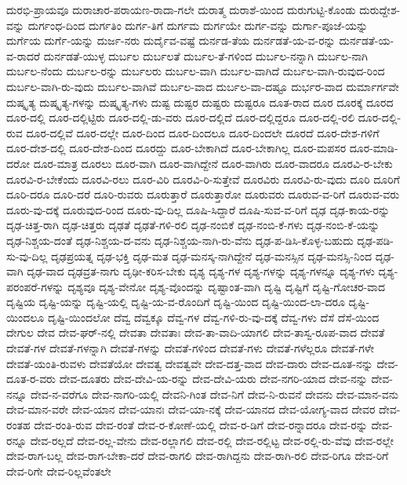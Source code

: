 {ದುರಭಿ-ಪ್ರಾಯವೂ
ದುರಾಚಾರ-ಪರಾಯಣ-ರಾದಾ-ಗಲೇ
ದುರಾತ್ಮ
ದುರಾಶೆ-ಯಿಂದ
ದುರುಗುಟ್ಟಿ-ಕೊಂಡು
ದುರುದ್ದೇಶ-ವನ್ನು
ದುರ್ಗಂಧ-ದಿಂದ
ದುರ್ಗತಿಂ
ದುರ್ಗ-ತಿಗೆ
ದುರ್ಗಮ
ದುರ್ಗಯೇ
ದುರ್ಗ-ವನ್ನು
ದುರ್ಗಾ-ಪೂಜೆ-ಯನ್ನು
ದುರ್ಗೆಯ
ದುರ್ಗೆ-ಯನ್ನು
ದುರ್ಜ-ನರು
ದುರ್ದೈವ-ವಷ್ಟೆ
ದುರ್ನಡ-ತೆಯ
ದುರ್ನಡತೆ-ಯ-ವ-ರನ್ನು
ದುರ್ನಡತೆ-ಯ-ವ-ರಾದರೆ
ದುರ್ನಡತೆ-ಯುಳ್ಳ
ದುರ್ಬಲ
ದುರ್ಬಲತೆ
ದುರ್ಬಲ-ತೆ-ಗಳಿಂದ
ದುರ್ಬಲ-ನನ್ನಾಗಿ
ದುರ್ಬಲ-ನಾಗಿ
ದುರ್ಬಲ-ನೆಂದು
ದುರ್ಬಲ-ರನ್ನು
ದುರ್ಬಲರು
ದುರ್ಬಲ-ವಾಗಿ
ದುರ್ಬಲ-ವಾಗಿದೆ
ದುರ್ಬಲ-ವಾಗಿ-ರುವುದ-ರಿಂದ
ದುರ್ಬಲ-ವಾಗಿ-ರು-ವುದು
ದುರ್ಬಲ-ವಾಗಿವೆ
ದುರ್ಬಲ-ವಾದ
ದುರ್ಬಲ-ವಾ-ದಷ್ಟೂ
ದುರ್ಭರ-ವಾದ
ದುರ್ಮಾರ್ಗವೇ
ದುಷ್ಕೃತ್ಯ
ದುಷ್ಕೃತ್ಯ-ಗಳನ್ನು
ದುಷ್ಕೃತ್ಯ-ಗಳು
ದುಷ್ಟ
ದುಷ್ಟರ
ದುಷ್ಟರು
ದುಷ್ಟರೂ
ದೂತ-ರಾದ
ದೂರ
ದೂರಕ್ಕೆ
ದೂರದ
ದೂರ-ದಲ್ಲಿ
ದೂರ-ದಲ್ಲಿಟ್ಟಿರು
ದೂರ-ದಲ್ಲಿ-ಡು-ವರು
ದೂರ-ದಲ್ಲಿದೆ
ದೂರ-ದಲ್ಲಿದ್ದರೂ
ದೂರ-ದಲ್ಲಿ-ರಲಿ
ದೂರ-ದಲ್ಲಿ-ರುವ
ದೂರ-ದಲ್ಲಿವೆ
ದೂರ-ದಲ್ಲೇ
ದೂರ-ದಿಂದ
ದೂರ-ದಿಂದಲೂ
ದೂರ-ದಿಂದಲೇ
ದೂರದೆ
ದೂರ-ದೇಶ-ಗಳಿಗೆ
ದೂರ-ದೇಶ-ದಲ್ಲಿ
ದೂರ-ದೇಶ-ದಿಂದ
ದೂರದ್ದು
ದೂರ-ಬೇಕಾಗಿದೆ
ದೂರ-ಬೇಕಾಗಿಲ್ಲ
ದೂರ-ಮಪಸರ
ದೂರ-ಮಾಡಿ-ದರೋ
ದೂರ-ಮಾತ್ರ
ದೂರಲು
ದೂರ-ವಾಗಿ
ದೂರ-ವಾಗಿದ್ದೇನೆ
ದೂರ-ವಾಗಿರು
ದೂರ-ವಾದರೂ
ದೂರವಿ-ರ-ಬೇಕು
ದೂರವಿ-ರ-ಬೇಕೆಂದು
ದೂರವಿ-ರಲು
ದೂರ-ವಿರಿ
ದೂರವಿ-ರಿ-ಸುತ್ತೇವೆ
ದೂರವಿರು
ದೂರವಿ-ರು-ವುದು
ದೂರಿ
ದೂರಿಗೆ
ದೂರಿ-ದರೂ
ದೂರಿ-ದರೆ
ದೂರಿ-ರುವರು
ದೂರುತ್ತಾರೆ
ದೂರುತ್ತಾರೋ
ದೂರುವರು
ದೂರುವ-ವ-ರಿಗೆ
ದೂರುವ-ವರು
ದೂರು-ವು-ದಕ್ಕೆ
ದೂರುವುದ-ರಿಂದ
ದೂರು-ವು-ದಿಲ್ಲ
ದೂಷಿ-ಸಿದ್ದಾರೆ
ದೂಷಿ-ಸುವ-ವ-ರಿಗೆ
ದೃಢ
ದೃಢ-ಕಾಯ-ರನ್ನು
ದೃಢ-ಚಿತ್ತ-ರಾಗಿ
ದೃಢ-ಚಿತ್ತರು
ದೃಢತೆ
ದೃಢತೆ-ಗಳಿ-ರಲಿ
ದೃಢ-ನಂಬಿಕೆ
ದೃಢ-ನಂಬಿ-ಕೆ-ಗಳು
ದೃಢ-ನಂಬಿ-ಕೆ-ಯನ್ನು
ದೃಢ-ನಿಶ್ಚಯ-ದಂತೆ
ದೃಢ-ನಿಶ್ಚಯ-ದ-ವನು
ದೃಢ-ನಿಶ್ಚಯ-ನಾಗಿ-ರು-ವೆನು
ದೃಢ-ಪ-ಡಿಸಿ-ಕೊಳ್ಳ-ಬಹುದು
ದೃಢ-ಪಡಿ-ಸು-ವು-ದಿಲ್ಲ
ದೃಢಪ್ರಯತ್ನ
ದೃಢ-ಭಕ್ತಿ
ದೃಢ-ಮತ
ದೃಢ-ಮನಸ್ಕ-ನಾಗಿದ್ದೇನೆ
ದೃಢ-ಮನಸ್ಸಿನ
ದೃಢ-ಮನಸ್ಸಿ-ನಿಂದ
ದೃಢ-ವಾಗಿ
ದೃಢ-ವಾದ
ದೃಢವ್ರತ-ನಾಗು
ದೃಢೀ-ಕರಿಸ-ಬೇಕು
ದೃಶ್ಯ
ದೃಶ್ಯ-ಗಳ
ದೃಶ್ಯ-ಗಳನ್ನು
ದೃಶ್ಯ-ಗಳನ್ನೂ
ದೃಶ್ಯ-ಗಳು
ದೃಶ್ಯ-ಪರಂಪರೆ-ಗಳನ್ನು
ದೃಶ್ಯವೂ
ದೃಶ್ಯ-ವೇನೋ
ದೃಶ್ಯ-ವೊಂದನ್ನು
ದೃಷ್ಟಾಂತ-ವಾಗಿ
ದೃಷ್ಟಿ
ದೃಷ್ಟಿಗೆ
ದೃಷ್ಟಿ-ಗೋಚರ-ವಾದ
ದೃಷ್ಟಿಯ
ದೃಷ್ಟಿ-ಯನ್ನು
ದೃಷ್ಟಿ-ಯಲ್ಲಿ
ದೃಷ್ಟಿ-ಯ-ವ-ರೊಂದಿಗೆ
ದೃಷ್ಟಿ-ಯಿಂದ
ದೃಷ್ಟಿ-ಯಿಂದ-ಲಾ-ದರೂ
ದೃಷ್ಟಿ-ಯಿಂದಲೂ
ದೃಷ್ಟಿ-ಯಿಂದಲೋ
ದೆವ್ವ
ದೆವ್ವಕ್ಕೂ
ದೆವ್ವ-ಗಳ
ದೆವ್ವ-ಗಳಿ-ರು-ವು-ದಕ್ಕೆ
ದೆವ್ವ-ಗಳು
ದೆಸೆ
ದೆಸೆ-ಯಿಂದ
ದೇಗುಲ
ದೇವ
ದೇವ-ಘರ್‌-ನಲ್ಲಿ
ದೇವತಾ
ದೇವತಾಃ
ದೇವ-ತಾ-ವಾದಿ-ಯಾಗಲಿ
ದೇವ-ತಾಸ್ವ-ರೂಪ-ವಾದ
ದೇವತೆ
ದೇವತೆ-ಗಳ
ದೇವತೆ-ಗಳನ್ನಾಗಿ
ದೇವತೆ-ಗಳನ್ನು
ದೇವತೆ-ಗಳಿಂದ
ದೇವತೆ-ಗಳು
ದೇವತೆ-ಗಳೆಲ್ಲರೂ
ದೇವತೆ-ಗಳೇ
ದೇವತೆ-ಯಂತಿ-ರುವಳು
ದೇವತೆಯೋ
ದೇವತ್ವ
ದೇವತ್ವವೇ
ದೇವ-ದತ್ತ-ವಾದ
ದೇವ-ದಾರು
ದೇವ-ದೂತ-ನನ್ನು
ದೇವ-ದೂತ-ರ-ವರು
ದೇವ-ದೂತರು
ದೇವ-ದೇವಿ-ಯ-ರನ್ನು
ದೇವ-ದೇವಿ-ಯರು
ದೇವ-ನಗರಿ-ಯಾದ
ದೇವ-ನನ್ನು
ದೇವ-ನನ್ನೂ
ದೇವ-ನ-ವರೆಗೂ
ದೇವ-ನಾಗರಿ-ಯಲ್ಲಿ
ದೇವನಿ-ಗಿಂತ
ದೇವ-ನಿಗೆ
ದೇವ-ನಿ-ರುವನೆ
ದೇವನು
ದೇವ-ಮಾನ-ವನು
ದೇವ-ಮಾನ-ವರೇ
ದೇವ-ಯಾನ
ದೇವ-ಯಾನಃ
ದೇವ-ಯಾ-ನಕ್ಕೆ
ದೇವ-ಯಾನದ
ದೇವ-ಯೋಗ್ಯ-ವಾದ
ದೇವರ
ದೇವ-ರಂತಹ
ದೇವ-ರಂತಿ-ರುವ
ದೇವ-ರಂತೆ
ದೇವ-ರ-ಕೋಣೆ-ಯಲ್ಲಿ
ದೇವ-ರ-ಡಿಗೆ
ದೇವ-ರನ್ನಾದರೂ
ದೇವ-ರನ್ನು
ದೇವ-ರನ್ನೂ
ದೇವ-ರಲ್ಲದೆ
ದೇವ-ರಲ್ಲ-ವೇನು
ದೇವ-ರಲ್ಲಾಗಲಿ
ದೇವ-ರಲ್ಲಿ
ದೇವ-ರಲ್ಲಿಟ್ಟ
ದೇವ-ರಲ್ಲಿ-ರು-ವೆವು
ದೇವ-ರಲ್ಲೇ
ದೇವ-ರಾಗ-ಬಲ್ಲ
ದೇವ-ರಾಗ-ಬೇಕಾ-ದರೆ
ದೇವ-ರಾಗಲಿ
ದೇವ-ರಾಗಿದ್ದನು
ದೇವ-ರಾಗಿ-ರಲಿ
ದೇವ-ರಿಗೂ
ದೇವ-ರಿಗೆ
ದೇವ-ರಿಗೇ
ದೇವ-ರಿಲ್ಲವೆಂತಲೇ
}
